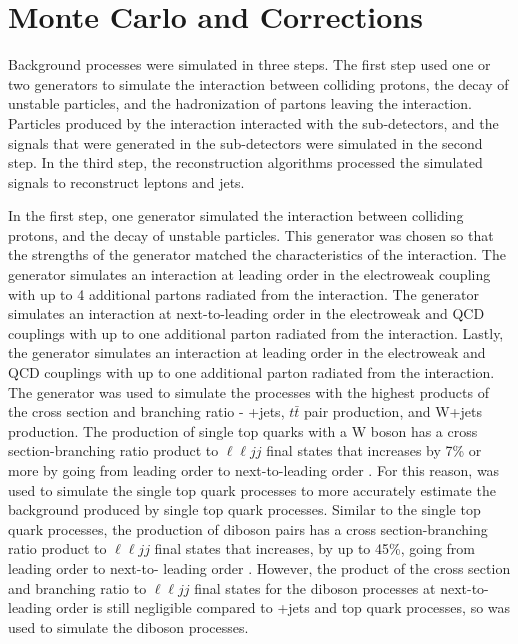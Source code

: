 \clearpage

\section{Monte Carlo and Corrections}
\label{sec:MC}
Background processes were simulated in three steps.  The first step used one or two \MC generators to simulate the interaction between 
colliding protons, the decay of unstable particles, and the hadronization of partons leaving the interaction.  Particles produced by the 
interaction interacted with the sub-detectors, and the signals that were generated in the sub-detectors were simulated in the second step.  
In the third step, the reconstruction algorithms processed the simulated signals to reconstruct leptons and jets.

In the first step, one \MC generator simulated the interaction between colliding protons, and the decay of unstable particles.  
This generator was chosen so that the strengths of the generator matched the characteristics of the interaction.  The \MADGRAPH generator 
\cite{madgraph} simulates an interaction at leading order in the electroweak coupling with up to 4 additional partons radiated from the 
interaction.  The \POWHEG generator \cite{powheg} simulates an interaction at next-to-leading order in the electroweak and QCD couplings 
with up to one additional parton radiated from the interaction.  Lastly, the \PYTHIA generator \cite{pythia8,Sjostrand:2006za} simulates 
an interaction at leading order in the electroweak and QCD couplings with up to one additional parton radiated from the interaction.  The 
\MADGRAPH generator was used to simulate the processes with the highest products of the cross section and branching ratio - \DY+jets, 
$t\bar{t}$ pair production, and W+jets production.  The production of single top quarks with a W boson has a cross section-branching 
ratio product to $\ell\ell jj$ final states that increases by 7\% or more by going from leading order to next-to-leading order 
\cite{singleTopNLOvsLO}.  For this reason, \POWHEG was used to simulate the single top quark processes to more accurately estimate the 
background produced by single top quark processes.  Similar to the single top quark processes, the production of diboson pairs has 
a cross section-branching ratio product to $\ell\ell jj$ final states that increases, by up to 45\%, going from leading order to next-to-
leading order \cite{dibosonLOvsNLO}.  However, the product of the cross section and branching ratio to $\ell\ell jj$ final states for the 
diboson processes at next-to-leading order is still negligible compared to \DY+jets and top quark processes, so \PYTHIA was used to 
simulate the diboson processes.

